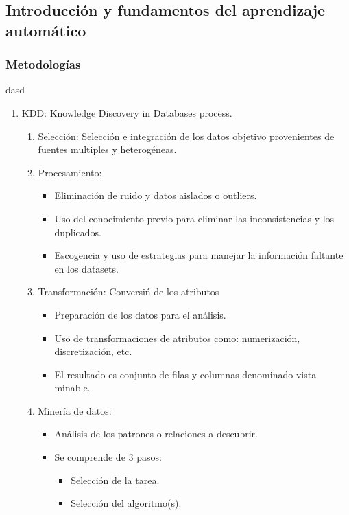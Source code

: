\subsection{Introducci\'on y fundamentos del aprendizaje autom\'atico}
\subsubsection{Metodolog\'ias}
dasd
\begin{enumerate}
    \item KDD: Knowledge Discovery in Databases process. 

    \begin{enumerate}
        \item Selecci\'on: Selecci\'on e integraci\'on de los datos objetivo provenientes de fuentes multiples y heterog\'eneas.
        \item Procesamiento: 
        \begin{itemize}
            \item Eliminaci\'on de ruido y datos aislados o outliers.
            \item Uso del conocimiento previo para eliminar las inconsistencias y los duplicados.
            \item Escogencia y uso de estrategias para manejar la informaci\'on faltante en los datasets.
        \end{itemize}
        \item Transformaci\'on: Conversi\'n de los atributos
        \begin{itemize}
            \item Preparaci\'on de los datos para el an\'alisis.
            \item Uso de transformaciones de atributos como: numerizaci\'on, discretizaci\'on, etc.
            \item El resultado es conjunto de filas y columnas denominado vista minable.
        \end{itemize}
        \item Miner\'ia de datos:
        \begin{itemize}
            \item An\'alisis de los patrones o relaciones a descubrir.
            \item Se comprende de 3 pasos:
            \begin{itemize}
                \item Selecci\'on de la tarea.
                \item Selecci\'on del algoritmo(s).

\end{itemize}
\end{itemize}
\end{enumerate}
\end{enumerate}

